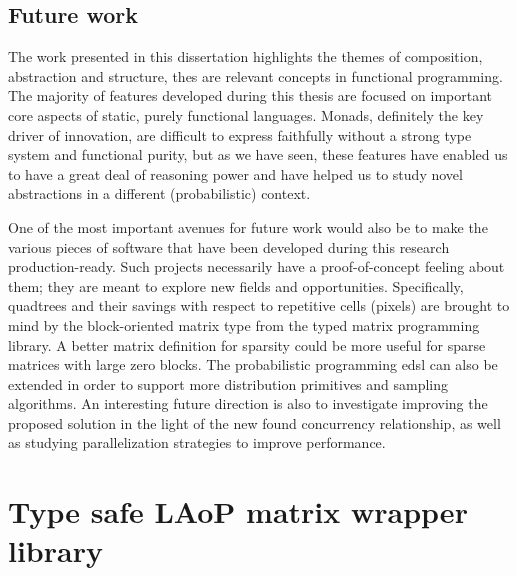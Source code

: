 \documentclass[
  oneside,
  11pt, a4paper,
  footinclude=true,
  headinclude=true,
  cleardoublepage=empty
]{scrbook}
\theoremstyle{definition}
\theoremstyle{definition}
\begin{document}
	    \section{Future work}
	    
	     The work presented in this dissertation highlights the themes of composition, abstraction and structure, thes are relevant concepts in functional programming. The majority of features developed during this thesis are focused on important core aspects of static, purely functional languages. Monads, definitely the key driver of innovation, are difficult to express faithfully without a strong type system and functional purity, but as we have seen, these features have enabled us to have a great deal of reasoning power and have helped us to study novel abstractions in a different (probabilistic) context.
	    
	     One of the most important avenues for future work would also be to make the various pieces of software that have been developed during this research production-ready. Such projects necessarily have a proof-of-concept feeling about them; they are meant to explore new fields and opportunities. Specifically, quadtrees \citep{samet1984quadtree} and their savings with respect to repetitive cells (pixels) are brought to mind by the block-oriented matrix type from the typed matrix programming library. A better matrix definition for sparsity could be more useful for sparse matrices with large zero blocks.  The probabilistic programming \gls{edsl} can also be extended in order to support more distribution primitives and sampling algorithms. An interesting future direction is also to investigate improving the proposed solution in the light of the new found concurrency relationship, as well as studying parallelization strategies to improve performance. 
	     

	

	
	
	
	\chapter{Type safe LAoP matrix wrapper library}\label{appendix-a}
	
\end{document}

